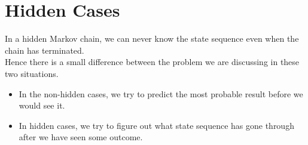 \documentclass{article}
\begin{document}
\section{Hidden Cases}
In a hidden Markov chain, we can never know the state sequence even when the chain has terminated. \\
Hence there is a small difference between the problem we are discussing in these two situations.
\begin{itemize}
    \item In the non-hidden cases, we try to predict the most probable result before we would see it.
    \item In hidden cases, we try to figure out what state sequence has gone through after we have seen some outcome.
\end{itemize}
\end{document}
